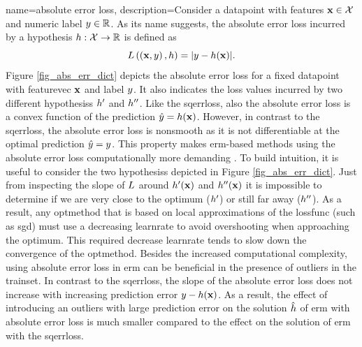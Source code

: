 {name={absolute error loss},
	description={Consider a \gls{datapoint} with \glspl{feature} ${\bf x} \in \mathcal{X}$ and numeric 
		\gls{label} $y \in \mathbb{R}$. As its name suggests, the absolute error \gls{loss} 
		incurred by a \gls{hypothesis} $h: \mathcal{X} \rightarrow \mathbb{R}$ 
		is defined as $$L\left(\left( {\bf x},y \right),h \right) = |y - h({\bf x})|.$$
		Figure \ref{fig_abs_err_dict} depicts the absolute error \gls{loss} for a fixed \gls{datapoint} 
		with \gls{featurevec} ${\bf x}$ and \gls{label} $y$. It also indicates the \gls{loss} values 
		incurred by two different \glspl{hypothesis} $h'$ and $h''$. Like the \gls{sqerrloss}, 
		also the absolute error \gls{loss} is a \gls{convex} \gls{function} of the \gls{prediction} $\hat{y}=h({\bf x})$. 
		However, in contrast to the \gls{sqerrloss}, the absolute error \gls{loss} is \gls{nonsmooth} as it is not 
		\gls{differentiable} at the optimal \gls{prediction} $\hat{y}=y$. This property 
		makes \gls{erm}-based methods using the absolute error \gls{loss} computationally more demanding \cite{OptMLBook,nesterov04}. 
	    To build intuition, it is useful to consider the two \glspl{hypothesis} depicted in Figure \ref{fig_abs_err_dict}. 
	    Just from inspecting the slope of $L$ around $h'({\bf x})$ and $h''({\bf x})$
	     it is impossible to determine if we are very close to the optimum ($h'$) or still far away ($h''$). 
	     As a result, any \gls{optmethod} that is based on local approximations of the \gls{lossfunc} (such as \gls{sgd}) 
	     must use a decreasing \gls{learnrate} to avoid overshooting when approaching the optimum. This required 
	     decrease \gls{learnrate} tends to slow down the convergence of the 
	     \gls{optmethod}. Besides the increased computational complexity, using absolute error \gls{loss} in \gls{erm} can 
	     be beneficial in the presence of \glspl{outlier} in the \gls{trainset}. In contrast to the \gls{sqerrloss}, 
	     the slope of the absolute error \gls{loss} does not increase with increasing \gls{prediction} error 
	     $y - h({\bf x})$. As a result, the effect of introducing an \glspl{outlier} with 
	     large \gls{prediction} error on the solution $\hat{h}$ of \gls{erm} with absolute error \gls{loss} 
	     is much smaller compared to the effect on the solution of \gls{erm} with the \gls{sqerrloss}. 
}}
